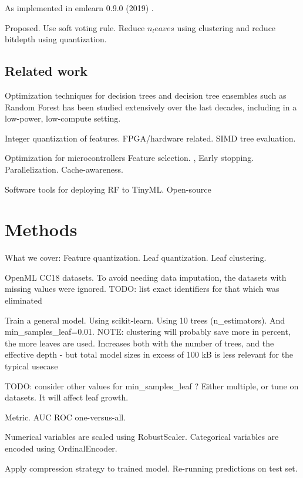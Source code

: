 \documentclass{article}
\begin{document}
As implemented in emlearn 0.9.0 (2019) \cite{emlearn}.

Proposed. Use soft voting rule. Reduce $n_leaves$ using clustering and reduce bitdepth using quantization.

\subsection{Related work}

Optimization techniques for decision trees and decision tree ensembles such as Random Forest has been studied extensively over the last decades, including in a low-power, low-compute setting.

Integer quantization of features.
FPGA/hardware related.
SIMD tree evaluation.

Optimization for microcontrollers \cite{tabanelli_optimizing_2022}
Feature selection. \cite{uddin_guided_2015}, \cite{elsts_energy-efficient_2020}
Early stopping. \cite{daghero_low-overhead_2022} \cite{daghero_adaptive_2021}
Parallelization.
Cache-awareness.

Software tools for deploying RF to TinyML. Open-source


\section{Methods}
What we cover: Feature quantization. Leaf quantization. Leaf clustering.

OpenML CC18 datasets. \cite{oml-benchmarking-suites}
To avoid needing data imputation, the datasets with missing values were ignored.
TODO: list exact identifiers for that which was eliminated

Train a general model. Using scikit-learn. \cite{scikit-learn}
Using 10 trees ({n_estimators}). And {min_samples_leaf=0.01}.
NOTE: clustering will probably save more in percent, the more leaves are used.
Increases both with the number of trees, and the effective depth
- but total model sizes in excess of 100 kB is less relevant for the typical usecase

TODO: consider other values for {min_samples_leaf} ?
Either multiple, or tune on datasets.
It will affect leaf growth.

Metric. AUC ROC one-versus-all.

Numerical variables are scaled using RobustScaler.
Categorical variables are encoded using OrdinalEncoder.

Apply compression strategy to trained model. Re-running predictions on test set.
\end{document}
